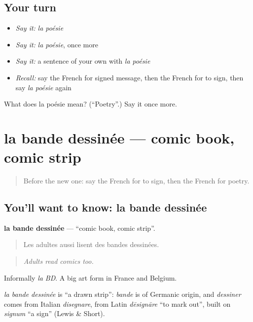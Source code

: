 \subsection*{Your turn}
\begin{itemize}
\raggedright
  \item \emph{Say it:} \emph{la poésie}
  \item \emph{Say it:} \emph{la poésie}, once more
  \item \emph{Say it:} a sentence of your own with \emph{la poésie}
  \item \emph{Recall:} say the French for signed message, then the French for to sign, then say \emph{la poésie} again
\end{itemize}

\begin{tcolorbox}[breakable,colback=teal!4,colframe=teal!35!black,title={Before you move on}]
What does la poésie mean? (\textquotedblleft{}Poetry\textquotedblright{}.) Say it once more.
\end{tcolorbox}
\section[la bande dessinée]{la bande dessinée — comic book, comic strip}

\label{lesson:FR-C522-bande-dessinee}



\begin{quote}
Before the new one: say the French for to sign, then the French for poetry.
\end{quote}

\subsection*{You'll want to know: la bande dessinée}
\textbf{la bande dessinée} — \textquotedblleft{}comic book, comic strip\textquotedblright{}.

\begin{quote}
Les adultes aussi lisent des bandes dessinées.
\end{quote}

\begin{quote}
\emph{Adults read comics too.}
\end{quote}

Informally \emph{la BD}. A big art form in France and Belgium.

\begin{cousinweb}
\emph{la bande dessinée} is \textquotedblleft{}a drawn strip\textquotedblright{}: \emph{bande} is of Germanic origin, and \emph{dessiner} comes from Italian \emph{disegnare}, from Latin \emph{dēsignāre} \textquotedblleft{}to mark out\textquotedblright{}, built on \emph{signum} \textquotedblleft{}a sign\textquotedblright{} (Lewis \& Short).
\end{cousinweb}

